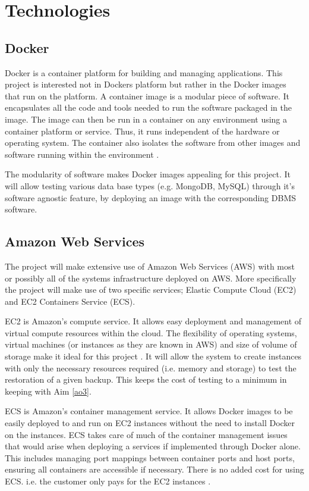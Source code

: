 \section{Technologies}

\subsection{Docker}
Docker is a container platform for building and managing applications. This project is interested not in Dockers platform but rather in the Docker images that run on the platform. A container image is a modular piece of software. It encapsulates all the code and tools needed to run the software packaged in the image. The image can then be run in a container on any environment using a container platform or service. Thus, it runs independent of the hardware or operating system. The container also isolates the software from other images and software running within the environment \citep{docker}.

The modularity of software makes Docker images appealing for this project. It will allow testing various data base types (e.g. MongoDB, MySQL) through it's software agnostic feature, by deploying an image with the corresponding DBMS software.

\subsection{Amazon Web Services}
The project will make extensive use of Amazon Web Services (AWS) with most or possibly all of the systems infrastructure deployed on AWS. More specifically the project will make use of two specific services; Elastic Compute Cloud (EC2) and EC2 Containers Service (ECS).

EC2 is Amazon's compute service. It allows easy deployment and management of virtual compute resources within the cloud. The flexibility of operating systems, virtual machines (or instances as they are known in AWS) and size of volume of storage make it ideal for this project \citep{ec2}. It will allow the system to create instances with only the necessary resources required (i.e. memory and storage) to test the restoration of a given backup. This keeps the cost of testing to a minimum in keeping with Aim \ref{ao3}.

ECS is Amazon's container management service. It allows Docker images to be easily deployed to and run on  EC2 instances without the need to install Docker on the instances. ECS takes care of much of the container management issues that would arise when deploying a services if implemented through Docker alone. This includes managing port mappings between container ports and host ports, ensuring all containers are accessible if necessary. There is no added cost for using ECS. i.e. the customer only pays for the EC2 instances \citep{ecs}. 

